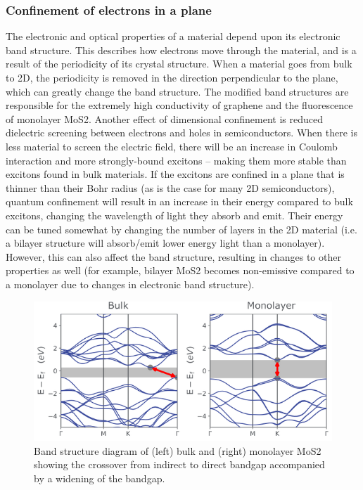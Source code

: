 \documentclass[12pt,a4paper]{report}
\begin{document}
\subsubsection{Confinement of electrons in a plane  }
The electronic and optical properties of a material depend upon its electronic band structure. This describes how electrons move through the material, and is a result of the periodicity of its crystal structure. When a material goes from bulk to 2D, the periodicity is removed in the direction perpendicular to the plane, which can greatly change the band structure. The modified band structures are responsible for the extremely high conductivity of graphene and the fluorescence of monolayer MoS2.
Another effect of dimensional confinement is reduced dielectric screening between electrons and holes in semiconductors. When there is less material to screen the electric field, there will be an increase in Coulomb interaction and more strongly-bound excitons – making them more stable than excitons found in bulk materials. If the excitons are confined in a plane that is thinner than their Bohr radius (as is the case for many 2D semiconductors), quantum confinement will result in an increase in their energy compared to bulk excitons, changing the wavelength of light they absorb and emit.
Their energy can be tuned somewhat by changing the number of layers in the 2D material (i.e. a bilayer structure will absorb/emit lower energy light than a monolayer). However, this can also affect the band structure, resulting in changes to other properties as well (for example, bilayer MoS2 becomes non-emissive compared to a monolayer due to changes in electronic band structure).
\begin{figure}
  \centering
  \includegraphics[scale=2]{2.2.1.png}
  \caption{Band structure diagram of (left) bulk and (right) monolayer MoS2 showing the crossover from indirect to direct bandgap accompanied by a widening of the bandgap.}
  \label{bandgap}
  \end{figure}
\end{document}
